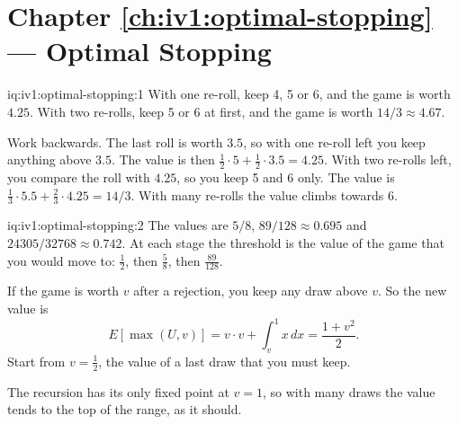 \section*{Chapter \ref{ch:iv1:optimal-stopping} --- Optimal Stopping}

\begin{solution}{iq:iv1:optimal-stopping:1}
With one re-roll, keep 4, 5 or 6, and the game is worth $4.25$. With two re-rolls, keep 5 or 6 at first, and the game is worth $14/3 \approx 4.67$.

Work backwards. The last roll is worth $3.5$, so with one re-roll left you keep anything above $3.5$. The value is then $\tfrac12 \cdot 5 + \tfrac12 \cdot 3.5 = 4.25$. With two re-rolls left, you compare the roll with $4.25$, so you keep 5 and 6 only. The value is $\tfrac13 \cdot 5.5 + \tfrac23 \cdot 4.25 = 14/3$. With many re-rolls the value climbs towards 6.

\end{solution}

\begin{solution}{iq:iv1:optimal-stopping:2}
The values are $5/8$, $89/128 \approx 0.695$ and $24305/32768 \approx 0.742$. At each stage the threshold is the value of the game that you would move to: $\tfrac12$, then $\tfrac58$, then $\tfrac{89}{128}$.

If the game is worth $v$ after a rejection, you keep any draw above $v$. So the new value is
\[
E[\max(U, v)] = v \cdot v + \int_v^1 x\,dx = \frac{1 + v^2}{2}.
\]
Start from $v = \tfrac12$, the value of a last draw that you must keep.

The recursion has its only fixed point at $v = 1$, so with many draws the value tends to the top of the range, as it should.

\end{solution}

